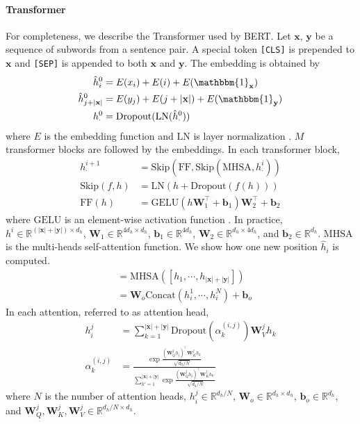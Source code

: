 \documentclass[11pt,a4paper]{article}
\newcommand{\LN}{\text{LN}\xspace}
\newcommand{\Skip}{\text{Skip}\xspace}
\newcommand{\dropout}{\text{Dropout}\xspace}
\newcommand{\FF}{\text{FF}\xspace}
\newcommand{\SA}{\text{MHSA}\xspace}
\newcommand{\gelu}{\text{GELU}\xspace}
\newcommand{\concat}{\text{Concat}\xspace}
\newcommand{\yy}{\mathbf{y}}
\newcommand{\xx}{\mathbf{x}}
\newcommand{\bb}{\mathbf{b}}
\newcommand{\WW}{\mathbf{W}}
\newcommand{\calR}{\mathbb{R}}
\begin{document}
\paragraph{Transformer} For completeness, we describe the Transformer used by BERT. Let $\xx$, $\yy$ be a sequence of subwords from a sentence pair. A special token \texttt{[CLS]} is prepended to $\xx$ and \texttt{[SEP]} is appended to both $\xx$ and $\yy$. The embedding is obtained by
\begin{align*}
\hat{h}^0_i &= E(x_i) + E(i) + E(\mathbbm{1}_\xx)  \\
\hat{h}^0_{j+|\mathbf{x}|} &= E(y_j) + E(j+|\mathbf{x}|) + E(\mathbbm{1}_\yy)  \\
h_\cdot^{0} &= \dropout(\LN(\hat{h}_\cdot^{0})) 
\end{align*}
where $E$ is the embedding function and $\LN$ is layer normalization \cite{ba2016layer}. $M$ transformer blocks are followed by the embeddings. In each transformer block,
\begin{align*}
h^{i+1}_{\cdot} &= \Skip(\FF, \Skip(\SA, h^i_{\cdot}))  \\
\Skip(f, h) &= \LN(h + \dropout(f(h)))  \\
\FF(h) &= \gelu(h \WW_1^\top + \bb_1) \WW_2^\top + \bb_2 
\end{align*}
where $\gelu$ is an element-wise activation function \cite{hendrycks2016bridging}. In practice, $h^i \in \calR^{(|\xx| + |\yy|)\times d_h}$, $\WW_1 \in \calR^{4d_h \times d_h}$, $\bb_1 \in \calR^{4d_h}$, $\WW_2 \in \calR^{d_h \times 4d_h}$, and $\bb_2 \in \calR^{d_h}$. $\SA$ is the multi-heads self-attention function. We show how one new position $\hat{h}_i$ is computed.
\begin{align*}
[\cdots,\hat{h}_i,\cdots] &=\SA([h_1, \cdots, h_{|\xx|+|\yy|}]) \\
&= \WW_o \concat(h^1_i, \cdots, h^N_i) + \bb_o
\end{align*}
In each attention, referred to as attention head,
\begin{align*}
h^j_i &= \sum^{|\xx|+|\yy|}_{k=1} \dropout(\alpha^{(i,j)}_k) \WW^j_V h_k \\
\alpha^{(i,j)}_k &= \frac{\exp \frac {(\WW^j_Q h_i)^\top \WW^j_K h_k} {\sqrt{d_h/N}} }
{\sum^{|\xx|+|\yy|}_{k'=1} \exp \frac {(\WW^j_Q h_i)^\top \WW^j_K h_{k'}} {\sqrt{d_h/N}}}
\end{align*}
where $N$ is the number of attention heads, $h^j_i \in \calR^{d_h / N}$, $\WW_o \in \calR^{d_h\times d_h}$, $\bb_o \in \calR^{d_h}$, and $\WW^j_Q,\WW^j_K,\WW^j_V \in \calR^{d_h/N\times d_h}$.
\end{document}
